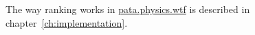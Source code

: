 The way ranking works in \url{pata.physics.wtf} is described in chapter~\ref{ch:implementation}.


\stopcontents[chapters]

